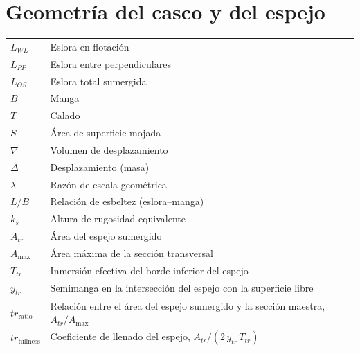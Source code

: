 \section*{Geometría del casco y del espejo}
\begin{longtable}{@{}p{} p{}@{}}
$L_{WL}$    & Eslora en flotación \\
$L_{PP}$    & Eslora entre perpendiculares \\
$L_{OS}$    & Eslora total sumergida \\
$B$         & Manga \\
$T$         & Calado \\
$S$         & Área de superficie mojada \\
$\nabla$    & Volumen de desplazamiento \\
$\Delta$    & Desplazamiento (masa) \\
$\lambda$   & Razón de escala geométrica \\
$L/B$       & Relación de esbeltez (eslora--manga) \\
$k_s$       & Altura de rugosidad equivalente \\
$A_{tr}$    & Área del espejo sumergido \\
$A_{\max}$  & Área máxima de la sección transversal \\
$T_{tr}$    & Inmersión efectiva del borde inferior del espejo \\
$y_{tr}$    & Semimanga en la intersección del espejo con la superficie libre \\
$tr_{\text{ratio}}$    & Relación entre el área del espejo sumergido y la sección maestra, $A_{tr}/A_{\max}$ \\
$tr_{\text{fullness}}$ & Coeficiente de llenado del espejo, $A_{tr}/(2\,y_{tr}\,T_{tr})$ \\
\end{longtable}

